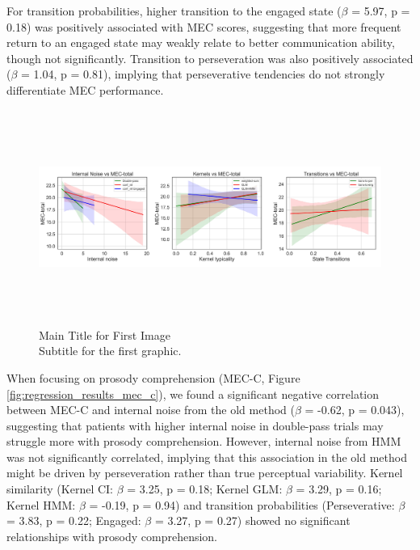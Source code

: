 For transition probabilities, higher transition to the engaged state ($\beta$ = 5.97, p = 0.18) was positively associated with MEC scores, suggesting that more frequent return to an engaged state may weakly relate to better communication ability, though not significantly. Transition to perseveration was also positively associated ($\beta$ = 1.04, p = 0.81), implying that perseverative tendencies do not strongly differentiate MEC performance.
\begin{figure}[H]
    \centering
    \includegraphics[width=17cm,height=7cm]{MainLayout/Images/chapter8/regression_results_mec.jpg}
    \caption{Main Title for First Image \\ \small Subtitle for the first graphic.}
    \label{fig:regression_results_mec}
\end{figure}
When focusing on prosody comprehension (MEC-C, Figure \ref{fig:regression_results_mec_c}), we found a significant negative correlation between MEC-C and internal noise from the old method ($\beta$ = -0.62, p = 0.043), suggesting that patients with higher internal noise in double-pass trials may struggle more with prosody comprehension. However, internal noise from HMM was not significantly correlated, implying that this association in the old method might be driven by perseveration rather than true perceptual variability. Kernel similarity (Kernel CI: $\beta$ = 3.25, p = 0.18; Kernel GLM: $\beta$ = 3.29, p = 0.16; Kernel HMM: $\beta$ = -0.19, p = 0.94) and transition probabilities (Perseverative: $\beta$ = 3.83, p = 0.22; Engaged: $\beta$ = 3.27, p = 0.27) showed no significant relationships with prosody comprehension.
